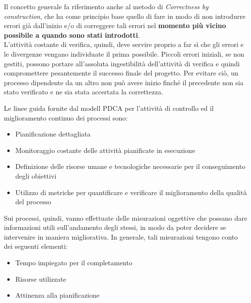 \documentclass[a4paper,11pt]{article}
\begin{document}
Il concetto generale fa riferimento anche al metodo di \textit{Correctness by construction}, che ha come principio base quello di fare in modo di non introdurre errori già dall'inizio e/o di correggere tali errori nel \textbf{momento più vicino possibile a quando sono stati introdotti}.\\ L'attività costante di verifica, quindi,  deve servire proprio a far sì che gli errori e le divergenze vengano individuate il prima possibile.
Piccoli errori iniziali, se non gestiti, possono portare all'assoluta ingestibilità dell'attività di verifica e quindi compromettere pesantemente il successo finale del progetto. Per evitare ciò, un processo dipendente da un altro non può avere inizio finché il precedente non sia stato verificato e ne sia stata accertata la correttezza. 

Le linee guida fornite dal modell PDCA per l'attività di controllo ed il miglioramento continuo dei processi sono:
\begin{itemize}
\item Pianificazione dettagliata
\item Monitoraggio costante delle attività pianificate in esecuzione
\item Definizione delle risorse umane e tecnologiche necessarie per il conseguimento degli obiettivi
\item Utilizzo di metriche per quantificare e verificare il miglioramento della qualità del processo
\end{itemize}  
Sui processi, quindi, vanno effettuate delle misurazioni oggettive che possano dare informazioni utili sull'andamento degli stessi, in modo da poter decidere se intervenire in maniera migliorativa. 
In generale, tali misurazioni tengono conto dei seguenti elementi: 
\begin{itemize}
\item Tempo impiegato per il completamento
\item Risorse utilizzate 
\item Attinenza alla pianificazione
\end{itemize}
\end{document}
